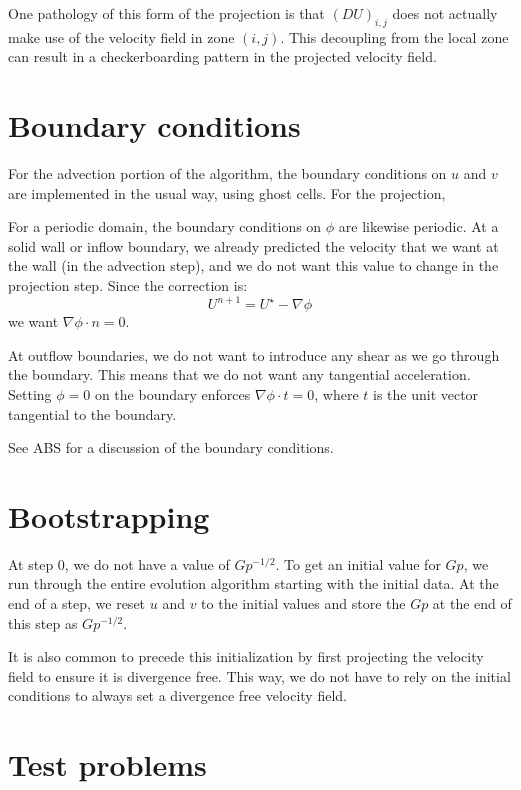 One pathology of this form of the projection is that $(DU)_{i,j}$ does
not actually make use of the velocity field in zone $(i,j)$.  This
decoupling from the local zone can result in a checkerboarding pattern
in the projected velocity field.

\section{Boundary conditions}

For the advection portion of the algorithm, the boundary conditions
on $u$ and $v$ are implemented in the usual way, using ghost cells.
For the projection, 

For a periodic domain, the boundary conditions on $\phi$ are likewise
periodic.  At a solid wall or inflow boundary, we already predicted
the velocity that we want at the wall (in the advection step), and we
do not want this value to change in the projection step.  Since the
correction is:
\begin{equation}
U^{n+1} = U^\star - \nabla \phi
\end{equation}
we want $\nabla \phi \cdot n = 0$.  

At outflow boundaries, we do not want to introduce any shear as we go
through the boundary.  This means that we do not want any tangential
acceleration.  Setting $\phi = 0$ on the boundary enforces $\nabla
\phi \cdot t = 0$, where $t$ is the unit vector tangential to the
boundary.

See ABS for a discussion of the boundary conditions.

\section{Bootstrapping}

At step 0, we do not have a value of $Gp^{-1/2}$.  To get an initial value
for $Gp$, we run through the entire evolution algorithm starting with the
initial data.  At the end of a step, we reset $u$ and $v$ to the initial
values and store the $Gp$ at the end of this step as $Gp^{-1/2}$.

It is also common to precede this initialization by first projecting
the velocity field to ensure it is divergence free.  This way, we do
not have to rely on the initial conditions to always set a divergence
free velocity field.


\section{Test problems}

